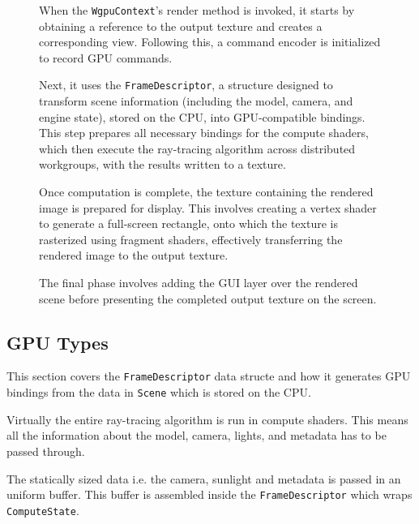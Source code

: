\begin{figure}[H]
\noindent\begin{minipage}[t]{0.65\textwidth}
  \vspace{0.5cm}
  When the \verb|WgpuContext|'s render method is invoked, it starts by obtaining a reference to the output texture and creates a corresponding view. Following this, a command encoder is initialized to record GPU commands.

  Next, it uses the \verb|FrameDescriptor|, a structure designed to transform scene information (including the model, camera, and engine state), stored on the CPU, into GPU-compatible bindings. This step prepares all necessary bindings for the compute shaders, which then execute the ray-tracing algorithm across distributed workgroups, with the results written to a texture.

  Once computation is complete, the texture containing the rendered image is prepared for display. This involves creating a vertex shader to generate a full-screen rectangle, onto which the texture is rasterized using fragment shaders, effectively transferring the rendered image to the output texture.

  The final phase involves adding the GUI layer over the rendered scene before presenting the completed output texture on the screen.

\end{minipage}
\hfill
\begin{minipage}[t]{0.3\textwidth}
  \vspace{-0.5cm}
  \begin{figure}[H]
    \centering
    
  \end{figure}
\end{minipage}
\end{figure}

\subsection{GPU Types}
This section covers the \verb|FrameDescriptor| data structe and how it generates GPU bindings from the data in \verb|Scene| which is stored on the CPU.

Virtually the entire ray-tracing algorithm is run in compute shaders. This means all the information about the model, camera, lights, and metadata has to be passed through.

The statically sized data i.e. the camera, sunlight and metadata is passed in an uniform buffer. This buffer is assembled inside the \verb|FrameDescriptor| which wraps \verb|ComputeState|.

